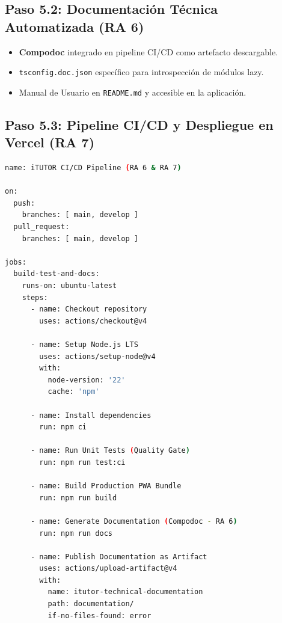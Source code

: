 \documentclass[11pt,a4paper]{article}
\begin{document}
\subsection{Paso 5.2: Documentación Técnica Automatizada (RA 6)}
\begin{itemize}[leftmargin=*]
    \item \textbf{Compodoc} integrado en pipeline CI/CD como artefacto descargable.
    \item \texttt{tsconfig.doc.json} específico para introspección de módulos lazy.
    \item Manual de Usuario en \texttt{README.md} y accesible en la aplicación.
\end{itemize}

\subsection{Paso 5.3: Pipeline CI/CD y Despliegue en Vercel (RA 7)}

\begin{lstlisting}[language=bash, caption={Pipeline CI/CD completo de GitHub Actions (.github/workflows/ci-cd.yml)}]
name: iTUTOR CI/CD Pipeline (RA 6 & RA 7)

on:
  push:
    branches: [ main, develop ]
  pull_request:
    branches: [ main, develop ]

jobs:
  build-test-and-docs:
    runs-on: ubuntu-latest
    steps:
      - name: Checkout repository
        uses: actions/checkout@v4

      - name: Setup Node.js LTS
        uses: actions/setup-node@v4
        with:
          node-version: '22'
          cache: 'npm'

      - name: Install dependencies
        run: npm ci

      - name: Run Unit Tests (Quality Gate)
        run: npm run test:ci

      - name: Build Production PWA Bundle
        run: npm run build

      - name: Generate Documentation (Compodoc - RA 6)
        run: npm run docs

      - name: Publish Documentation as Artifact
        uses: actions/upload-artifact@v4
        with:
          name: itutor-technical-documentation
          path: documentation/
          if-no-files-found: error
\end{lstlisting}

\end{document}
